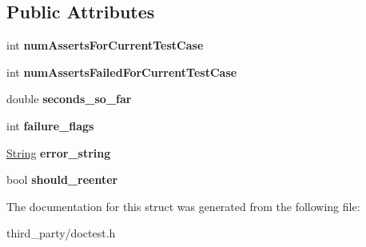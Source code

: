 \subsection*{Public Attributes}
\begin{DoxyCompactItemize}
\item 
\mbox{\label{structdoctest_1_1_current_test_case_stats_af03dd03f35198cfe4729e19eb621b7af}} 
int {\bfseries num\+Asserts\+For\+Current\+Test\+Case}
\item 
\mbox{\label{structdoctest_1_1_current_test_case_stats_a64f7718c8d5703a52050d0c715a27ae0}} 
int {\bfseries num\+Asserts\+Failed\+For\+Current\+Test\+Case}
\item 
\mbox{\label{structdoctest_1_1_current_test_case_stats_a90c722e1e949dc3f8d290b770a9d3e28}} 
double {\bfseries seconds\+\_\+so\+\_\+far}
\item 
\mbox{\label{structdoctest_1_1_current_test_case_stats_aaa58c52fd07a20e6e4daf19eecb2e2ba}} 
int {\bfseries failure\+\_\+flags}
\item 
\mbox{\label{structdoctest_1_1_current_test_case_stats_a12dfd58b35249b999694a6bf5083f9b3}} 
\mbox{\hyperlink{classdoctest_1_1_string}{String}} {\bfseries error\+\_\+string}
\item 
\mbox{\label{structdoctest_1_1_current_test_case_stats_aac8702e2ab04313bc42448449a82267a}} 
bool {\bfseries should\+\_\+reenter}
\end{DoxyCompactItemize}


The documentation for this struct was generated from the following file\+:\begin{DoxyCompactItemize}
\item 
third\+\_\+party/doctest.\+h\end{DoxyCompactItemize}
